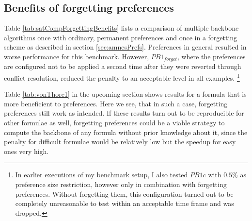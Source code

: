 \subsection{Benefits of forgetting preferences}
Table \ref{tab:satCompForgettingBenefits}
lists a comparison of multiple backbone algorithms once with ordinary, permanent preferences and once in a forgetting scheme as described in section \ref{sec:amnesPrefs}. Preferences in general resulted in worse performance for this benchmark. However, $PB1_{forget}$, where the preferences are configured not to be applied a second time after they were reverted through conflict resolution, reduced the penalty to an acceptable level in all examples. \footnote{
In earlier executions of my benchmark setup, I also tested $PB1c$ with $0.5\%$ as preference size restriction, however only in combination with forgetting preferences. Without forgetting them, this configuration turned out to be completely unreasonable to test within an acceptable time frame and was dropped.}


Table \ref{tab:vonThore1} in the upcoming section shows results for a formula that is more beneficient to preferences. Here we see, that in such a case, forgetting preferences still work as intended. If these results turn out to be reproducible for other formulae as well, forgetting preferences could be a viable strategy to compute the backbone of any formula without prior knowledge about it, since the penalty for difficult formulae would be relatively low but the speedup for easy ones very high.


